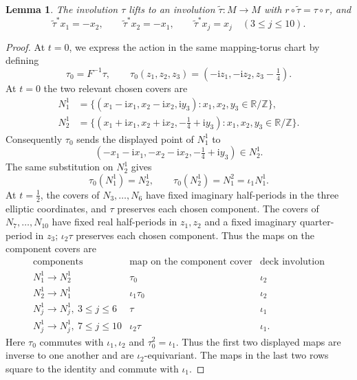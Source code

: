 \documentclass[11pt]{article}
\newtheorem{lemma}[theorem]{Lemma}
\theoremstyle{remark}\newtheorem{remark}[theorem]{Remark}
\newcommand{\ii}{\mathrm i}
\newcommand{\R}{\mathbb R}
\newcommand{\Z}{\mathbb Z}
\begin{document}
\begin{lemma}\label{lem:tau-lift}
The involution $\tau$ lifts to an involution $\widetilde\tau:M\to M$ with
$r\circ\widetilde\tau=\tau\circ r$, and
\begin{equation}\label{eq:tau-x}
\widetilde\tau^*x_1=-x_2,\qquad \widetilde\tau^*x_2=-x_1,\qquad
\widetilde\tau^*x_j=x_j\quad(3\le j\le10).
\end{equation}
\end{lemma}
\begin{proof}
At $t=0$, we express the action in the same mapping-torus chart by defining
\begin{equation}\label{eq:tau0}
\tau_0=F^{-1}\tau,\qquad
\tau_0(z_1,z_2,z_3)=(-\ii z_1,-\ii z_2,z_3-\tfrac14).
\end{equation}
At $t=0$ the two relevant chosen covers are
\begin{align*}
N_1^1&=\{(x_1-\ii x_1,x_2-\ii x_2,\ii y_3):x_1,x_2,y_3\in\R/\Z\},\\
N_2^1&=\{(x_1+\ii x_1,x_2+\ii x_2,-\tfrac14+\ii y_3):
             x_1,x_2,y_3\in\R/\Z\}.
\end{align*}
Consequently $\tau_0$ sends the displayed point of $N_1^1$ to
\[
(-x_1-\ii x_1,-x_2-\ii x_2,-\tfrac14+\ii y_3)\in N_2^1.
\]
The same substitution on $N_2^1$ gives
\[
\tau_0(N_1^1)=N_2^1,\qquad
\tau_0(N_2^1)=N_1^2=\iota_1N_1^1.
\]
At $t=\frac12$, the covers of $N_3,\ldots,N_6$ have fixed imaginary
half-periods in the three elliptic coordinates, and $\tau$ preserves each
chosen component.  The covers of $N_7,\ldots,N_{10}$ have fixed real
half-periods in $z_1,z_2$ and a fixed imaginary quarter-period in $z_3$;
$\iota_2\tau$ preserves each chosen component.  Thus the maps on the
component covers are
\begin{equation}\label{eq:component-lifts}
\begin{array}{c|c|c}
\text{components}&\text{map on the component cover}&\text{deck involution}\\
\hline
N_1^1\longrightarrow N_2^1&\tau_0&\iota_2\\
N_2^1\longrightarrow N_1^1&\iota_1\tau_0&\iota_2\\
N_j^1\longrightarrow N_j^1,\ 3\le j\le6&\tau&\iota_1\\
N_j^1\longrightarrow N_j^1,\ 7\le j\le10&\iota_2\tau&\iota_1.
\end{array}
\end{equation}
Here $\tau_0$ commutes with $\iota_1,\iota_2$ and
$\tau_0^2=\iota_1$.  Thus the first two displayed maps are inverse to one
another and are $\iota_2$-equivariant.  The maps in the last two rows square
to the identity and commute with $\iota_1$.


\end{proof}
\end{document}
